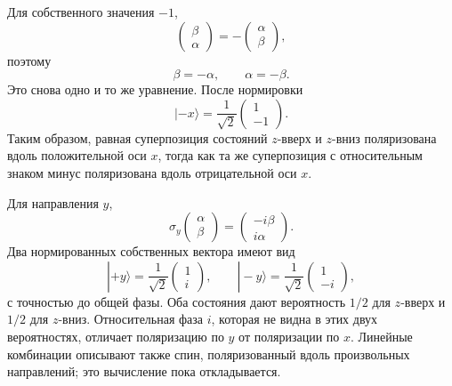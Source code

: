 Для собственного значения \(-1\),
\begin{equation}
\begin{pmatrix}
\beta\\
\alpha
\end{pmatrix}
=
-
\begin{pmatrix}
\alpha\\
\beta
\end{pmatrix},
\end{equation}
поэтому
\begin{equation}
\beta=-\alpha,
\qquad
\alpha=-\beta.
\end{equation}
Это снова одно и то же уравнение. После нормировки
\begin{equation}
|-x\rangle
=
\frac{1}{\sqrt2}
\begin{pmatrix}
1\\
-1
\end{pmatrix}.
\end{equation}
Таким образом, равная суперпозиция состояний \(z\)-вверх и \(z\)-вниз поляризована вдоль положительной оси \(x\), тогда как та же суперпозиция с относительным знаком минус поляризована вдоль отрицательной оси \(x\).

Для направления \(y\),
\begin{equation}
\sigma_y
\begin{pmatrix}
\alpha\\
\beta
\end{pmatrix}
=
\begin{pmatrix}
-i\beta\\
i\alpha
\end{pmatrix}.
\end{equation}
Два нормированных собственных вектора имеют вид
\begin{equation}
|+y\rangle
=
\frac{1}{\sqrt2}
\begin{pmatrix}
1\\
i
\end{pmatrix},
\qquad
|-y\rangle
=
\frac{1}{\sqrt2}
\begin{pmatrix}
1\\
-i
\end{pmatrix},
\end{equation}
с точностью до общей фазы. Оба состояния дают вероятность \(1/2\) для \(z\)-вверх и \(1/2\) для \(z\)-вниз. Относительная фаза \(i\), которая не видна в этих двух вероятностях, отличает поляризацию по \(y\) от поляризации по \(x\). Линейные комбинации описывают также спин, поляризованный вдоль произвольных направлений; это вычисление пока откладывается.

